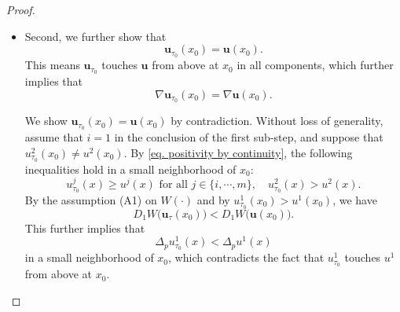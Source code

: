\documentclass[11pt,twoside,reqno]{amsart}
\newcounter{assu}
\numberwithin{equation}{section}
\begin{document}
\begin{proof}
\begin{itemize}
    To see this, we first obtain from the supremum assumption on $\tau_{0}$ that there exists a sequence $\{x_{k}\}\subseteq\mathbb{R}$ for sufficiently large $k$, such that
    \begin{equation}\label{eq. w(x_k) negative}
        w_{\tau_{0}-\frac{1}{k}}^{i_{k}}(x_{k})<0\quad\mbox{for some }i_{k}\in\{1,\cdots,m\}.
    \end{equation}
    However, let $x\in(-\infty,a'')\cup(b'',+\infty)$ and let $\tau\geq\frac{\tau_{0}}{2}$, then it follows from $x^{\tau}\geq x$ and \eqref{M0L} that $$\mathbf{u}_{\tau}(x)\geq \mathbf{u}(x).$$ Therefore, we see that $x_{k}\in[a'',b'']$ for sufficiently large $k$. Consequently, there exists a subsequence of $x_{k}$ and some $x_{\infty}\in[a'',b'']$, such that $x_{k}\to x_{\infty}$ and $i_{k}=constant=:i_{\infty}$. It then follows from \eqref{eq. positivity by continuity} and \eqref{eq. w(x_k) negative} that $$w_{\tau_{0}}^{i_{\infty}}(x_{\infty})=0.$$ Moreover, since $x_{\infty}\in[a'',b'']$, we get $\mathbf{u}(x_{\infty})\neq\pm\mathbf{e}$. Then the first sub-step is verified by setting $x_{0}=x_{\infty}$ and $i=i_{\infty}$.

    \item Second, we further show that $$\mathbf{u}_{\tau_{0}}(x_{0})=\mathbf{u}(x_{0}).$$ This means $\mathbf{u}_{\tau_{0}}$ touches $\mathbf{u}$ from above at $x_{0}$ in all components, which further implies that $$\nabla\mathbf{u}_{\tau_{0}}(x_{0})=\nabla\mathbf{u}(x_{0}).$$
    
    We show $\mathbf{u}_{\tau_{0}}(x_{0})=\mathbf{u}(x_{0})$ by contradiction. Without loss of generality, assume that $i=1$ in the conclusion of the first sub-step, and suppose that $u_{\tau_{0}}^{2}(x_{0})\neq u^{2}(x_{0})$. By \eqref{eq. positivity by continuity}, the following inequalities hold in a small neighborhood of $x_{0}$:
    \begin{equation*}
        u_{\tau_{0}}^{j}(x)\geq u^{j}(x)\mbox{ for all }j\in\{i,\cdots,m\},\quad u_{\tau_{0}}^{2}(x)>u^{2}(x).
    \end{equation*}
    By the assumption (A1) on $W(\cdot)$ and by $u_{\tau_{0}}^{1}(x_{0})>u^{1}(x_{0})$, we have
    \begin{equation*}
        D_{1}W\big(\mathbf{u}_{\tau}(x_{0})\big)<D_{1}W\big(\mathbf{u}(x_{0})\big).
    \end{equation*}
    This further implies that $$\Delta_{p}u_{\tau_{0}}^{1}(x)<\Delta_{p}u^{1}(x)$$ in a small neighborhood of $x_{0}$, which contradicts the fact that $u_{\tau_{0}}^{1}$ touches $u^{1}$ from above at $x_{0}$.


\end{itemize}
\end{proof}
\end{document}
